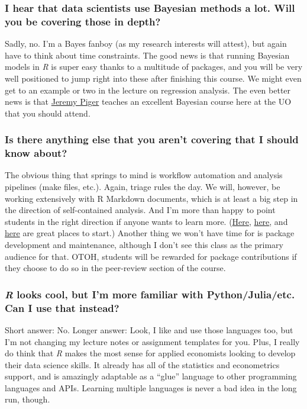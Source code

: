 \documentclass[12]{article}
\begin{document}
\vspace{-0.25cm}
\subsubsection*{I hear that data scientists use Bayesian methods a lot. Will you be covering those in depth?}
Sadly, no. I'm a Bayes fanboy (as my research interests will attest), but again have to think about time constraints. The good news is that running Bayesian models in \textit{R} is super easy thanks to a multitude of packages, and you will be very well positioned to jump right into these after finishing this course. We might even get to an example or two in the lecture on regression analysis. The even better news is that \href{https://pages.uoregon.edu/jpiger/}{Jeremy Piger} teaches an excellent Bayesian course here at the UO that you should attend.

\vspace{-0.25cm}
\subsubsection*{Is there anything else that you aren't covering that I should know about?}
The obvious thing that springs to mind is workflow automation and analysis pipelines (make files, etc.). Again, triage rules the day. We will, however, be working extensively with R Markdown documents, which is at least a big step in the direction of self-contained analysis. And I'm more than happy to point students in the right direction if anyone wants to learn more. (\href{http://stat545.com/Classroom/notes/cm109.nb.html}{Here}, \href{https://ropenscilabs.github.io/drake-manual/index.html}{here}, and \href{https://web.stanford.edu/~gentzkow/research/CodeAndData.pdf}{here} are great places to start.) Another thing we won't have time for is package development and maintenance, although I don't see this class as the primary audience for that. OTOH, students will be rewarded for package contributions if they choose to do so in the peer-review section of the course. 

\vspace{-0.25cm}
\subsubsection*{\textit{R} looks cool, but I'm more familiar with Python/Julia/etc. Can I use that instead?}
Short answer: No. Longer answer: Look, I like and use those languages too, but I'm not changing my lecture notes or assignment templates for you. Plus, I really do think that \textit{R} makes the most sense for applied economists looking to develop their data science skills. It already has all of the statistics and econometrics support, and is amazingly adaptable as a ``glue'' language to other programming languages and APIs. Learning multiple languages is never a bad idea in the long run, though.
\end{document}
